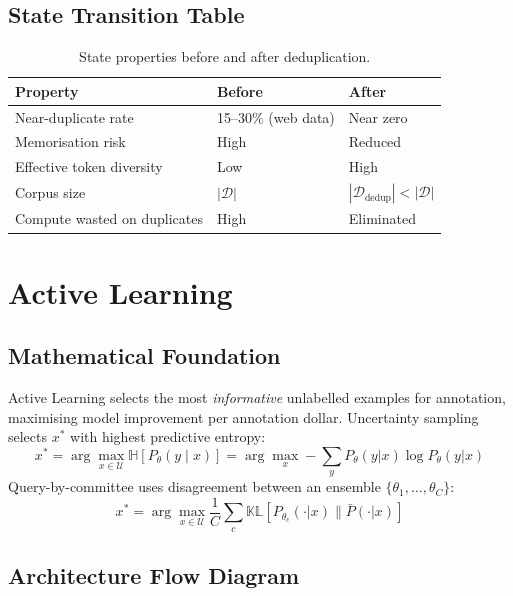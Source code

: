 \subsection{State Transition Table}
\begin{table}[h]\centering
\begin{tabular}{lll}\toprule
\textbf{Property} & \textbf{Before} & \textbf{After}\\\midrule
Near-duplicate rate & 15--30\% (web data) & Near zero\\
Memorisation risk & High & Reduced\\
Effective token diversity & Low & High\\
Corpus size & $|\mathcal{D}|$ & $|\mathcal{D}_{\text{dedup}}| < |\mathcal{D}|$\\
Compute wasted on duplicates & High & Eliminated\\\bottomrule
\end{tabular}
\caption{State properties before and after deduplication.}
\end{table}

\newpage
\section{Active Learning}

\subsection{Mathematical Foundation}
Active Learning selects the most \emph{informative} unlabelled examples for annotation, maximising model improvement per annotation dollar. Uncertainty sampling selects $x^*$ with highest predictive entropy:
\begin{equation}
  x^* = \arg\max_{x \in \mathcal{U}} \mathbb{H}[P_\theta(y \mid x)] = \arg\max_x -\sum_y P_\theta(y|x)\log P_\theta(y|x)
\end{equation}
Query-by-committee uses disagreement between an ensemble $\{\theta_1,\ldots,\theta_C\}$:
\begin{equation}
  x^* = \arg\max_{x \in \mathcal{U}} \frac{1}{C}\sum_c \mathbb{KL}[P_{\theta_c}(\cdot|x) \| \bar{P}(\cdot|x)]
\end{equation}

\subsection{Architecture Flow Diagram}

